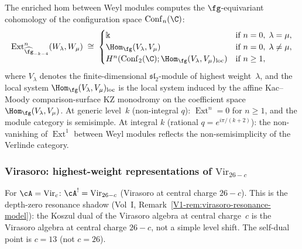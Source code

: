 \begin{computation}
The enriched hom between Weyl modules computes the
$\fg$-equivariant cohomology of the configuration space
$\mathrm{Conf}_n(\C)$:
\begin{equation}
\operatorname{Ext}^n_{\widehat{\fg}_{-k-4}}
(W_\lambda,W_\mu)
\;\cong\;
\begin{cases}
\Bbbk & \text{if } n=0,\;\lambda=\mu, \\
\Hom_{\fg}(V_\lambda,V_\mu) & \text{if } n=0,\;
 \lambda\ne\mu, \\
H^n(\mathrm{Conf}_2(\C);
 \Hom_{\fg}(V_\lambda,V_\mu)_{\mathrm{loc}})
 & \text{if } n\ge 1,
\end{cases}
\end{equation}
where $V_\lambda$ denotes the finite-dimensional
$\mathfrak{sl}_2$-module of highest weight~$\lambda$,
and the local system
$\Hom_{\fg}(V_\lambda,V_\mu)_{\mathrm{loc}}$
is the local system induced by the affine Kac--Moody
comparison-surface KZ monodromy on the coefficient space
$\Hom_{\fg}(V_\lambda,V_\mu)$.
At generic level~$k$ (non-integral $q$):
$\operatorname{Ext}^n=0$ for $n\ge 1$, and the
module category is semisimple. At integral $k$
(rational $q=e^{i\pi/(k+2)}$): the non-vanishing of
$\operatorname{Ext}^1$ between Weyl modules reflects
the non-semisimplicity of the Verlinde category.
\end{computation}

\subsubsection{Virasoro: highest-weight representations of $\mathrm{Vir}_{26-c}$}

For $\cA=\mathrm{Vir}_c$:
$\cA^!=\mathrm{Vir}_{26-c}$
(Virasoro at central charge $26-c$). This is the
depth-zero resonance shadow
(Vol~I, Remark~\ref*{V1-rem:virasoro-resonance-model}): the
Koszul dual of the Virasoro algebra at central charge~$c$
is the Virasoro algebra at central charge $26-c$, not a
simple level shift. The self-dual point is $c=13$
(not $c=26$).

